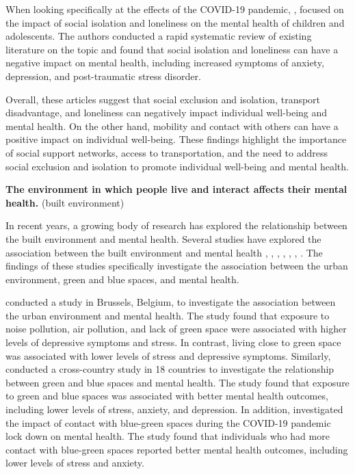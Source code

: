 \documentclass[
  letterpaper,
  authoryear]{elsarticle}
\begin{document}
When looking specifically at the effects of the COVID-19 pandemic,
\citet{loades2020} , focused on the impact of social isolation and
loneliness on the mental health of children and adolescents. The authors
conducted a rapid systematic review of existing literature on the topic
and found that social isolation and loneliness can have a negative
impact on mental health, including increased symptoms of anxiety,
depression, and post-traumatic stress disorder.

Overall, these articles suggest that social exclusion and isolation,
transport disadvantage, and loneliness can negatively impact individual
well-being and mental health. On the other hand, mobility and contact
with others can have a positive impact on individual well-being. These
findings highlight the importance of social support networks, access to
transportation, and the need to address social exclusion and isolation
to promote individual well-being and mental health.

\textbf{The environment in which people live and interact affects their
mental health.} (built environment)

In recent years, a growing body of research has explored the
relationship between the built environment and mental health. Several
studies have explored the association between the built environment and
mental health \citep{pelgrims2021}, \citep{white2021},
\citep{pouso2021}, \citep{rautio2018}, \citep{gascon2018},
\citep{engemann2019}, \citep{hoisington2019}. The findings of these
studies specifically investigate the association between the urban
environment, green and blue spaces, and mental health.

\citet{pelgrims2021} conducted a study in Brussels, Belgium, to
investigate the association between the urban environment and mental
health. The study found that exposure to noise pollution, air pollution,
and lack of green space were associated with higher levels of depressive
symptoms and stress. In contrast, living close to green space was
associated with lower levels of stress and depressive symptoms.
Similarly, \citet{white2021} conducted a cross-country study in 18
countries to investigate the relationship between green and blue spaces
and mental health. The study found that exposure to green and blue
spaces was associated with better mental health outcomes, including
lower levels of stress, anxiety, and depression. In addition,
\citet{pouso2021} investigated the impact of contact with blue-green
spaces during the COVID-19 pandemic lock down on mental health. The
study found that individuals who had more contact with blue-green spaces
reported better mental health outcomes, including lower levels of stress
and anxiety.
\end{document}
